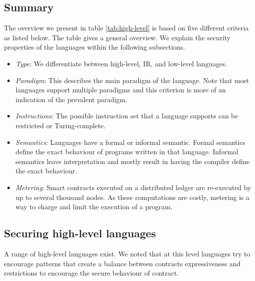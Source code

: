 \documentclass{llncs}
\begin{document}
\subsection{Summary}
The overview we present in table \ref{tab:high-level} is based on five different criteria as listed below. The table gives a general overview. We explain the security properties of the languages within the following subsections.
\begin{itemize}
\item \emph{Type}: We differentiate between high-level, IR, and low-level languages.
\item \emph{Paradigm}: This describes the main paradigm of the language. Note that most languages support multiple paradigms and this criterion is more of an indication of the prevalent paradigm.
\item \emph{Instructions}: The possible instruction set that a language supports can be restricted or Turing-complete.
\item \emph{Semantics}: Languages have a formal or informal semantic. Formal semantics define the exact behaviour of programs written in that language. Informal semantics leave interpretation and mostly result in having the compiler define the exact behaviour.
\item \emph{Metering}: Smart contracts executed on a distributed ledger are re-executed by up to several thousand nodes. As these computations are costly, metering is a way to charge and limit the execution of a program.
\end{itemize}



\subsection{Securing high-level languages}

A range of high-level languages exist. We noted that at this level languages try to encourage patterns that create a balance between contracts expressiveness and restrictions to encourage the secure behaviour of contract.
\end{document}
